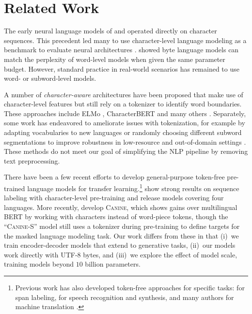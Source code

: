 \documentclass[11pt,a4paper]{article}
\begin{document}
\section{Related Work}
\label{sec:related-work}

The early neural language models of \citet{sutskever-2011-generating} and \citet{graves-2013-generating} operated directly on character sequences. This precedent led many to use character-level language modeling as a benchmark to evaluate neural architectures \cite{kalchbrenner-2016-bytenet, chung-2017-hierarchical, ha-2017-hypernets, zilly-2017-recurrent-highway-nets, melis-2018-sota-eval, al-rfou-2019-character-lm}. \citet{Choe2019BridgingTG} showed byte language models can match the perplexity of word-level models when given the same parameter budget. However, standard practice in real-world scenarios has remained to use word- or subword-level models.

A number of \textit{character-aware} architectures have been proposed that make use of character-level features but still rely on a tokenizer to identify word boundaries. These approaches include ELMo \cite{peters-etal-2018-deep}, CharacterBERT \cite{el-boukkouri-etal-2020-characterbert} and many others \cite{ling-2015-character, chung-etal-2016-character, kim-2016-character-aware, rafal-2016-exploring, wang-2020-nmt-with-byte, wei-2021-training}.
Separately, some work has endeavored to ameliorate issues with tokenization, for example by adapting vocabularies to new languages \cite{garcia-2021-continual} or randomly choosing different subword segmentations to improve robustness in low-resource and out-of-domain settings \cite{kudo-2018-subword}.
These methods do not meet our goal of simplifying the NLP pipeline by removing text preprocessing.

There have been a few recent efforts to develop general-purpose token-free pre-trained language models for transfer learning.\footnote{Previous work has also developed token-free approaches for specific tasks: \citet{gillick-etal-2016-multilingual} for span labeling, \citet{li-2019-bytes} for speech recognition and synthesis, and many authors for machine translation \cite{lee-etal-2017-fully, costa-jussa-etal-2017-byte, cherry-etal-2018-revisiting, shaham-levy-2021-neural}.}
\citet{akbik-etal-2018-contextual} show strong results on sequence labeling with character-level pre-training and release models covering four languages. More recently, \citet{clark2021canine} develop \textsc{Canine}, which shows gains over multilingual BERT by working with characters instead of word-piece tokens, though the ``\textsc{Canine}-S'' model still uses a tokenizer during pre-training to define targets for the masked language modeling task. Our work differs from these in that (i)~we train encoder-decoder models that extend to generative tasks, (ii)~our models work directly with UTF-8 bytes, and (iii)~we explore the effect of model scale, training models beyond $10$ billion parameters.
\end{document}

